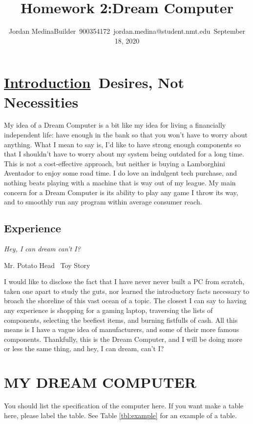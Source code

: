 \documentclass[letterpaper, 10 pt, conference]{IEEEconf}
\title{\LARGE \bf
Homework 2:\The Dream Computer
}
\author{Jordan Medina\Bob Builder\
\small 900354172\
\small jordan.medina@student.nmt.edu\
\small {September 18, 2020}
}
\begin{document}
\maketitle




\section{\underline{Introduction}\ Desires, Not Necessities}

My idea of a Dream Computer is a bit like my idea for living a financially independent life: have enough in the bank so that you won't have to worry about anything. What I mean to say is, I'd like to have strong enough components so that I shouldn't have to worry about my system being outdated for a long time. This is not a cost-effective approach, but neither is buying a Lamborghini Aventador to enjoy some road time. I do love an indulgent tech purchase, and nothing beats playing with a machine that is way out of my league. My main concern for a Dream Computer is its ability to play any game I throw its way, and to smoothly run any program within average consumer reach.
\subsection{Experience}

\epigraph{\textit{Hey, I can dream can't I?}}{Mr. Potato Head \ Toy Story}
I would like to disclose the fact that I have never never built a PC from scratch, taken one apart to study the guts, nor learned the introductory facts necessary to broach the shoreline of this vast ocean of a topic. The closest I can say to having any experience is shopping for a gaming laptop, traversing the lists of components, selecting the beefiest items, and burning fistfulls of cash. All this means is I have a vague idea of manufacturers, and some of their more famous components. Thankfully, this is the Dream Computer, and I will be doing more or less the same thing, and hey, I can dream, can't I?

\section{MY DREAM COMPUTER}

You should list the specification of the computer here. If
you want make a table here, please label the table. See Table
\ref{tbl:example} for an example of a table.
\end{document}
